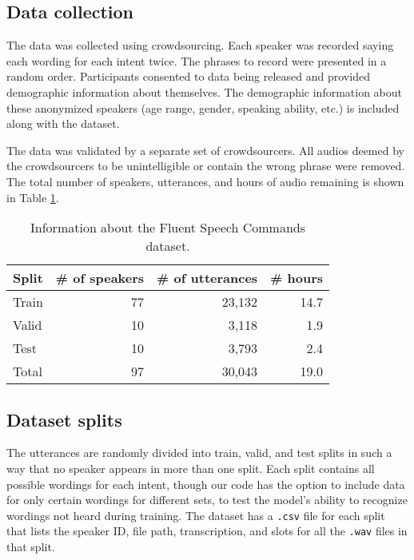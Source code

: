 \documentclass[a4paper]{article}
\begin{document}
\subsection{Data collection}
The data was collected using crowdsourcing. Each speaker was recorded saying each wording for each intent twice. The phrases to record were presented in a random order. Participants consented to data being released and provided demographic information about themselves. The demographic information about these anonymized speakers (age range, gender, speaking ability, etc.) is included along with the dataset.

The data was validated by a separate set of crowdsourcers.
All audios deemed by the crowdsourcers to be unintelligible or contain the wrong phrase were removed. The total number of speakers, utterances, and hours of audio remaining is shown in Table \ref{tab:dataset}. 

\begin{table}[]
  \caption{Information about the Fluent Speech Commands dataset.}
  \label{tab:dataset}
  \centering
  \begin{tabular}{l r r r}
    \toprule
    \textbf{Split} & \textbf{\# of speakers} & \textbf{\# of utterances} & \textbf{\# hours}\\
    \midrule
    Train & 77 & 23,132   & 14.7  \\
    Valid  & 10 & 3,118    & 1.9    \\
    Test  & 10 & 3,793   &  2.4 \\
    \midrule
    Total  & 97 & 30,043  & 19.0 \\
    \bottomrule
  \end{tabular}
  
\end{table}

\subsection{Dataset splits}
The utterances are randomly divided into train, valid, and test splits in such a way that no speaker appears in more than one split. Each split contains all possible wordings for each intent, though our code has the option to include data for only certain wordings for different sets, to test the model's ability to recognize wordings not heard during training. The dataset has a \texttt{.csv} file for each split that lists the speaker ID, file path, transcription, and slots for all the \texttt{.wav} files in that split.
\end{document}
